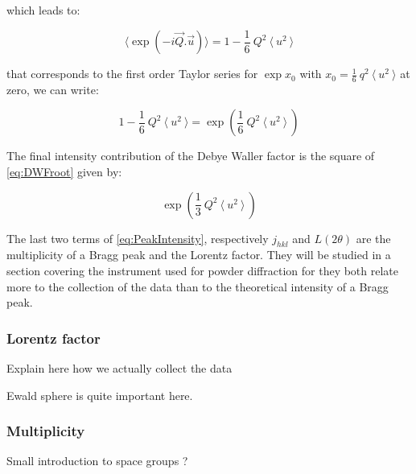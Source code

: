which leads to:

\begin{equation}
    \langle \exp{(- i \vec{Q}.\vec{u})}\rangle = 1 - \frac{1}{6} \ Q^2 \ \langle \ u^2 \ \rangle
\end{equation}

that corresponds to the first order Taylor series for $\exp{x_0}$ with $x_0 = \frac{1}{6} \ q^2 \ \langle \ u^2 \ \rangle $ at zero, we can write:

\begin{equation}
    \label{eq:DWFroot}
    1 - \frac{1}{6} \ Q^2 \ \langle \ u^2 \ \rangle = \exp{( \frac{1}{6} \ Q^2 \ \langle \ u^2 \ \rangle \ )}
\end{equation}

The final intensity contribution of the Debye Waller factor is the square of \eqref{eq:DWFroot} given by:

\begin{equation}
    \label{eq:DWF}
    \exp{( \frac{1}{3} \ Q^2 \ \langle \ u^2 \ \rangle \ )}
\end{equation}

The last two terms of \eqref{eq:PeakIntensity}, respectively $j_{hkl}$ and $L(2\theta)$ are the multiplicity of a Bragg peak and the Lorentz factor. They will be studied in a section covering the instrument used for powder diffraction for they both relate more to the collection of the data than to the theoretical intensity of a Bragg peak.

\subsubsection{Lorentz factor}

Explain here how we actually collect the data

Ewald sphere is quite important here.

\subsubsection{Multiplicity}

Small introduction to space groups ?


